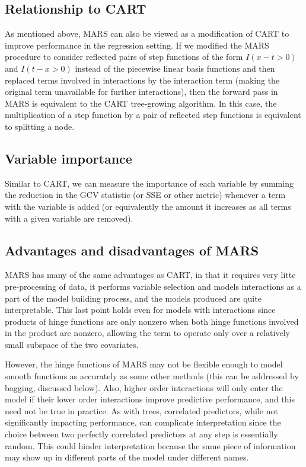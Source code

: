 \documentclass[12pt]{article}
\begin{document}
\subsection{Relationship to CART} %
\label{sub:relationship_to_cart}

As mentioned above, MARS can also be viewed as a modification of CART to improve performance in the regression setting. If we modified the MARS procedure to consider reflected pairs of step functions of the form $I(x - t > 0)$ and $I(t - x > 0)$ instead of the piecewise linear basis functions and then replaced terms involved in interactions by the interaction term (making the original term unavailable for further interactions), then the forward pass in MARS is equivalent to the CART tree-growing algorithm. In this case, the multiplication of a step function by a pair of reflected step functions is equivalent to splitting a node.


\subsection{Variable importance} %
\label{sub:variable_importance}

Similar to CART, we can measure the importance of each variable by summing the reduction in the GCV statistic (or SSE or other metric) whenever a term with the variable is added (or equivalently the amount it increases as all terms with a given variable are removed).


\subsection{Advantages and disadvantages of MARS} %
\label{sub:advantages_of_mars}

MARS has many of the same advantages as CART, in that it requires very litte pre-processing of data, it performs variable selection and models interactions as a part of the model building process, and the models produced are quite interpretable. This last point holds even for models with interactions since products of hinge functions are only nonzero when both hinge functions involved in the product are nonzero, allowing the term to operate only over a relatively small subspace of the two covariates.

However, the hinge functions of MARS may not be flexible enough to model smooth functions as accurately as some other methods (this can be addressed by bagging, discussed below). Also, higher order interactions will only enter the model if their lower order interactions improve predictive performance, and this need not be true in practice. As with trees, correlated predictors, while not significantly impacting performance, can complicate interpretation since the choice between two perfectly correlated predictors at any step is essentially random. This could hinder interpretation because the same piece of information may show up in different parts of the model under different names.
\end{document}
